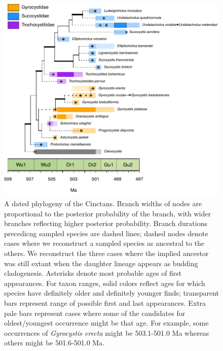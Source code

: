 \documentclass{article}
\begin{document}
\begin{figure}
  \includegraphics[width=\textwidth]{figures/Pretty Cinctans Families.pdf}

  \caption{A dated phylogeny of the Cinctans. Branch widths of nodes are proportional to the posterior probability of the branch, with wider branches reflecting higher posterior probability. Branch durations precedicng sampled species are dashed lines; dashed nodes denote cases where we reconstruct a sampled species as ancestral to the others.  We reconstruct the three cases where the implied ancestor was still extant when the daughter lineage appears as budding cladogenesis.  Asterisks denote most probable ages of first appearances.  For taxon ranges, solid colors reflect ages for which species have definitely older and definitely younger finds; transparent bars represent range of possible first and last appearances.  Extra pale bars represent cases where some of the candidates for oldest/youngest occurrence might be that age. For example,  some occurrences of \textit{Gyrocystis erecta} might be 503.1-501.0 Ma whereas others might be 501.6-501.0 Ma.  }
\end{figure}
\end{document}
